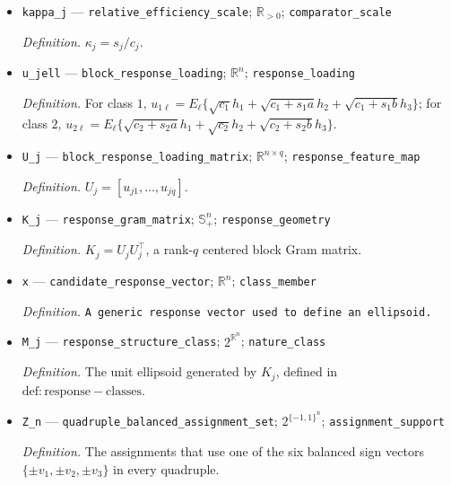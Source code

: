 \documentclass{article}
\begin{document}
\begin{itemize}
  \par\smallskip\noindent\emph{Definition.} The scale multiplying the two controllable squared-loading increments for class \(j\).
  \item \texttt{kappa\_\allowbreak{}j} --- \texttt{relative\_\allowbreak{}efficiency\_\allowbreak{}scale}; \(\mathbb R_{>0}\); \texttt{comparator\_\allowbreak{}scale}
  \par\smallskip\noindent\emph{Definition.} \(\kappa_j=s_j/c_j\).
  \item \texttt{u\_\allowbreak{}jell} --- \texttt{block\_\allowbreak{}response\_\allowbreak{}loading}; \(\mathbb R^n\); \texttt{response\_\allowbreak{}loading}
  \par\smallskip\noindent\emph{Definition.} For class \(1\), \(u_{1\ell}=E_\ell\{\sqrt{c_1}h_1+\sqrt{c_1+s_1a}h_2+\sqrt{c_1+s_1b}h_3\}\); for class \(2\), \(u_{2\ell}=E_\ell\{\sqrt{c_2+s_2a}h_1+\sqrt{c_2}h_2+\sqrt{c_2+s_2b}h_3\}\).
  \item \texttt{U\_\allowbreak{}j} --- \texttt{block\_\allowbreak{}response\_\allowbreak{}loading\_\allowbreak{}matrix}; \(\mathbb R^{n\times q}\); \texttt{response\_\allowbreak{}feature\_\allowbreak{}map}
  \par\smallskip\noindent\emph{Definition.} \(U_j=[u_{j1},\ldots,u_{jq}]\).
  \item \texttt{K\_\allowbreak{}j} --- \texttt{response\_\allowbreak{}gram\_\allowbreak{}matrix}; \(\mathbb S_+^n\); \texttt{response\_\allowbreak{}geometry}
  \par\smallskip\noindent\emph{Definition.} \(K_j=U_jU_j^\top\), a rank-\(q\) centered block Gram matrix.
  \item \texttt{x} --- \texttt{candidate\_\allowbreak{}response\_\allowbreak{}vector}; \(\mathbb R^n\); \texttt{class\_\allowbreak{}member}
  \par\smallskip\noindent\emph{Definition.} \texttt{A generic response vector used to define an ellipsoid.}
  \item \texttt{M\_\allowbreak{}j} --- \texttt{response\_\allowbreak{}structure\_\allowbreak{}class}; \(2^{\mathbb R^n}\); \texttt{nature\_\allowbreak{}class}
  \par\smallskip\noindent\emph{Definition.} The unit ellipsoid generated by \(K_j\), defined in \(\mathrm{def:response-classes}\).
  \item \texttt{Z\_\allowbreak{}n} --- \texttt{quadruple\_\allowbreak{}balanced\_\allowbreak{}assignment\_\allowbreak{}set}; \(2^{\{-1,1\}^n}\); \texttt{assignment\_\allowbreak{}support}
  \par\smallskip\noindent\emph{Definition.} The assignments that use one of the six balanced sign vectors \(\{\pm v_1,\pm v_2,\pm v_3\}\) in every quadruple.

\end{itemize}
\end{document}
